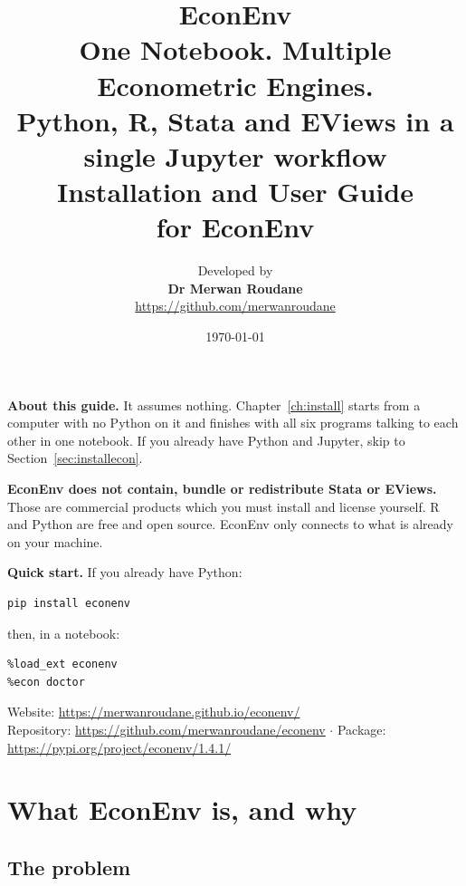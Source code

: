 \documentclass[11pt,a4paper]{report}
\title{
  \vspace{-1.5cm}
  {\Huge\bfseries EconEnv}\\[8pt]
  {\Large One Notebook. Multiple Econometric Engines.}\\[18pt]
  {\large Python, R, Stata and EViews in a single Jupyter workflow}\\[26pt]
  {\large\bfseries Installation and User Guide}\\[10pt]
  {\normalsize for EconEnv \econenvversion}
}
\author{
  {\large Developed by}\\[6pt]
  {\Large\bfseries Dr Merwan Roudane}\\[8pt]
  {\normalsize \url{https://github.com/merwanroudane}}
}
\date{\today}
\newcommand{\econenvversion}{1.4.1}
\begin{document}
\maketitle

\begin{center}
\begin{minipage}{0.86\textwidth}
\small
\textbf{About this guide.} It assumes nothing. Chapter~\ref{ch:install} starts
from a computer with no Python on it and finishes with all six programs
talking to each other in one notebook. If you already have Python and Jupyter,
skip to Section~\ref{sec:installecon}.

\medskip
\textbf{EconEnv does not contain, bundle or redistribute Stata or EViews.}
Those are commercial products which you must install and license yourself. R and
Python are free and open source. EconEnv only connects to what is already on
your machine.
\end{minipage}
\end{center}

\vspace{10pt}
\begin{center}
\begin{minipage}{0.86\textwidth}
\textbf{Quick start.} If you already have Python:
\begin{lstlisting}
pip install econenv
\end{lstlisting}
then, in a notebook:
\begin{lstlisting}
%load_ext econenv
%econ doctor
\end{lstlisting}
\end{minipage}
\end{center}

\vfill
\begin{center}
\small
Website: \url{https://merwanroudane.github.io/econenv/}\\[3pt]
Repository: \url{https://github.com/merwanroudane/econenv} \quad$\cdot$\quad
Package: \url{https://pypi.org/project/econenv/\econenvversion/}
\end{center}

\tableofcontents

\chapter{What EconEnv is, and why}

\section{The problem}
\end{document}
